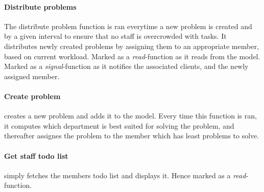 \paragraph{Distribute problems} The distribute problem function is ran everytime a new problem is created and by a given interval to ensure that no staff is overcrowded with tasks. 
It distributes newly created problems by assigning them to an appropriate \astaff[] member, based on current workload. %
Marked as a \textit{read}-function as it reads from the model. Marked as a \textit{signal}-function as it notifies the associated clients, and the newly assigned \astaff[] member. 


\paragraph{Create problem} creates a new problem and adds it to the model. Every time this function is ran, it computes which department is best suited for solving the problem, and thereafter assignes the problem to the \astaff[] member which has least problems to solve.  


\paragraph{Get staff todo list} simply fetches the \astaff[] members todo list and displays it. Hence marked as a \textit{read}-function. 

